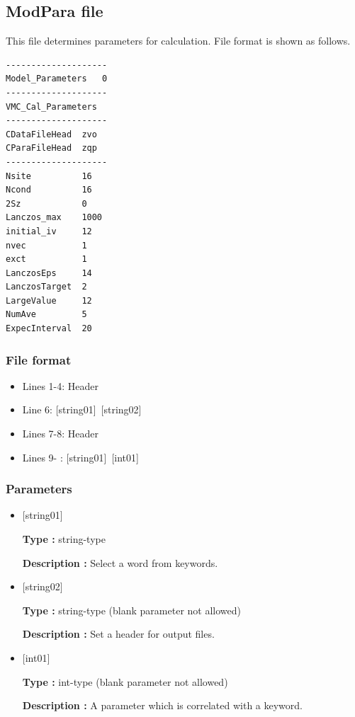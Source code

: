 \newpage
\subsection{ModPara file}
\label{Subsec:modpara}
This file determines parameters for calculation. File format is shown as follows.\\
\begin{minipage}{10cm}
\begin{screen}
\begin{verbatim}
--------------------
Model_Parameters   0
--------------------
VMC_Cal_Parameters
--------------------
CDataFileHead  zvo
CParaFileHead  zqp
--------------------
Nsite          16   
Ncond          16    
2Sz            0 
Lanczos_max    1000 
initial_iv     12   
nvec           1    
exct           1    
LanczosEps     14   
LanczosTarget  2    
LargeValue     12   
NumAve         5    
ExpecInterval  20   
\end{verbatim}
\end{screen}
\end{minipage}

\subsubsection{File format}
 \begin{itemize}
   \item  Lines 1-4:  Header
   \item  Line 6:  [string01]~[string02]
   \item  Lines 7-8:  Header
   \item  Lines 9- : [string01]~[int01]
  \end{itemize}
\subsubsection{Parameters}
\begin{itemize}
   \item  $[$string01$]$
   
   {\bf Type :} string-type

  {\bf Description :} Select a word from keywords.
   
   \item  $[$string02$]$
   
   {\bf Type :} string-type (blank parameter not allowed)

  {\bf Description :} Set a header for output files.

   \item  $[$int01$]$
   
   {\bf Type :} int-type (blank parameter not allowed)

  {\bf Description :} A parameter which is correlated with a keyword.
  \end{itemize}

